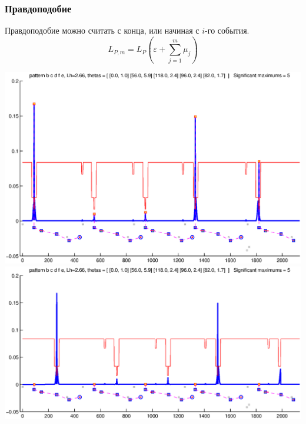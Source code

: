\documentclass[smaller]{beamer}
\begin{document}
\begin{frame}
  \frametitle{Правдоподобие}
   Правдоподобие можно считать с конца, или начиная с $i$-го события.
    $$L_{P,m}=L_P(\varepsilon+\sum_{j=1}^m\mu_j)$$
   \begin{center}
   \includegraphics[scale=0.2]{pat1.eps}
   \\
   \includegraphics[scale=0.2]{pat2.eps}
   \end{center}
\end{frame}
\end{document}

